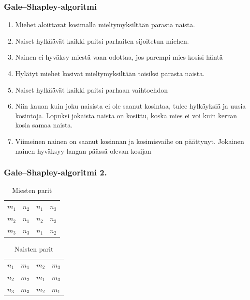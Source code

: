 \documentclass[table]{beamer}
\begin{document}
  \begin{frame}
    \frametitle{Gale--Shapley-algoritmi}
    \begin{enumerate}
	\item Miehet aloittavat kosimalla mieltymyksiltään parasta naista.
	\item Naiset hylkäävät kaikki paitsi parhaiten sijoitetun miehen.
	\item Nainen ei hyväksy miestä vaan odottaa, jos parempi mies kosisi häntä
	\item Hylätyt miehet kosivat mieltymyksiltään toisiksi parasta naista.
	\item Naiset hylkäävät kaikki paitsi parhaan vaihtoehdon
	\item Niin kauan kuin joku naisista ei ole saanut kosintaa, tulee hylkäyksiä ja uusia kosintoja. Lopuksi jokaista naista on kosittu, koska mies ei voi kuin kerran kosia samaa naista.
	\item Viimeinen nainen on saanut kosinnan ja kosimisvaihe on päättynyt. Jokainen nainen hyväksyy langan päässä olevan kosijan
\end{enumerate}
  \end{frame}
    \begin{frame}
  	\frametitle{Gale--Shapley-algoritmi 2.}
  	\begin{table}[h!]
	\begin{tabular}{ l | *{2}{c} r }
	 &  \\
	 \hline
 	 $m_{1}$ & \cellcolor{blue!50}$n_{2}$ & $n_{1}$ & $n_{3}$ \\
 	 $m_{2}$ & \cellcolor{blue!50}$n_{1}$ & $n_{2}$ & $n_{3}$ \\
 	 $m_{3}$ & \cellcolor{blue!50}$n_{3}$ & $n_{1}$ & $n_{2}$ \\
	\end{tabular}
	\caption{Miesten parit}
	\end{table}
	\begin{table}[h!]
	\begin{tabular}{ l | *{2}{c} r }
	 &  \\
	 \hline
 	 $n_{1}$ & $m_{1}$ & \cellcolor{pink!50}$m_{2}$ & $m_{3}$ \\
 	 $n_{2}$ & $m_{2}$ & \cellcolor{pink!50}$m_{1}$ & $m_{3}$ \\
 	 $n_{3}$ & \cellcolor{pink!50}$m_{3}$ & $m_{2}$ & $m_{1}$ \\
	\end{tabular}
	\caption{Naisten parit}
	\end{table}
  \end{frame}
\end{document}
